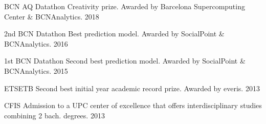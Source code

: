 
\begin{cvhonors}

  \cvhonor
    {BCN AQ Datathon} %
    {Creativity prize. Awarded by Barcelona Supercomputing Center \& BCNAnalytics.} %
    {} %
    {2018} %

  \cvhonor
    {2nd BCN Datathon} %
    {Best prediction model. Awarded by SocialPoint \& BCNAnalytics.} %
    {} %
    {2016} %

  \cvhonor
    {1st BCN Datathon} %
    {Second best prediction model. Awarded by SocialPoint \& BCNAnalytics.} %
    {} %
    {2015} %

  \cvhonor
    {ETSETB} %
    {Second best initial year academic record prize. Awarded by everis.} %
    {} %
    {2013} %

  \cvhonor
    {CFIS} %
    {Admission to a UPC center of excellence that offers interdisciplinary studies combining 2 bach. degrees.} %
    {} %
    {2013} %

\end{cvhonors}
